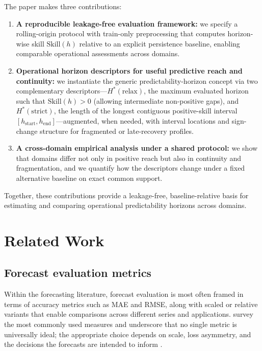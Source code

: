 \documentclass[pdflatex]{sn-jnl}
\begin{document}
The paper makes three contributions:
\begin{enumerate}
  \item \textbf{A reproducible leakage-free evaluation framework:} we specify a rolling-origin protocol with train-only preprocessing that computes horizon-wise skill $\mathrm{Skill}(h)$ relative to an explicit persistence baseline, enabling comparable operational assessments across domains.
  \item \textbf{Operational horizon descriptors for useful predictive reach and continuity:} we instantiate the generic predictability-horizon concept via two complementary descriptors—$H^*(\mathrm{relax})$, the maximum evaluated horizon such that $\mathrm{Skill}(h)>0$ (allowing intermediate non-positive gaps), and $H^*(\mathrm{strict})$, the length of the longest contiguous positive-skill interval $[h_{\mathrm{start}},h_{\mathrm{end}}]$—augmented, when needed, with interval locations and sign-change structure for fragmented or late-recovery profiles.
  \item \textbf{A cross-domain empirical analysis under a shared protocol:} we show that domains differ not only in positive reach but also in continuity and fragmentation, and we quantify how the descriptors change under a fixed alternative baseline on exact common support.
\end{enumerate}

Together, these contributions provide a leakage-free, baseline-relative basis for estimating and comparing operational predictability horizons across domains.


\section{Related Work}

\subsection{Forecast evaluation metrics}

Within the forecasting literature, forecast evaluation is most often framed in terms of
accuracy metrics such as MAE and RMSE, along with scaled or relative variants that enable
comparisons across different series and applications. \citet{hyndman2006} survey
the most commonly used measures and underscore that no single metric is universally ideal;
the appropriate choice depends on scale, loss asymmetry, and the decisions the forecasts are
intended to inform \citep{petropoulos2022}.
\end{document}
